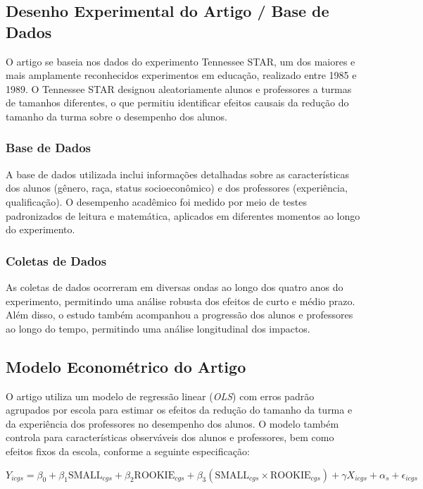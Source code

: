 \documentclass[a4paper,12pt]{article}[abntex2]
\begin{document}
\subsection{\textbf{Desenho Experimental do Artigo / Base de Dados}}

O artigo se baseia nos dados do experimento Tennessee STAR, um dos maiores e mais amplamente reconhecidos experimentos em educação, realizado entre 1985 e 1989. O Tennessee STAR designou aleatoriamente alunos e professores a turmas de tamanhos diferentes, o que permitiu identificar efeitos causais da redução do tamanho da turma sobre o desempenho dos alunos.

\subsubsection*{Base de Dados}
A base de dados utilizada inclui informações detalhadas sobre as características dos alunos (gênero, raça, status socioeconômico) e dos professores (experiência, qualificação). O desempenho acadêmico foi medido por meio de testes padronizados de leitura e matemática, aplicados em diferentes momentos ao longo do experimento.

\subsubsection*{Coletas de Dados}
As coletas de dados ocorreram em diversas ondas ao longo dos quatro anos do experimento, permitindo uma análise robusta dos efeitos de curto e médio prazo. Além disso, o estudo também acompanhou a progressão dos alunos e professores ao longo do tempo, permitindo uma análise longitudinal dos impactos.

\subsection{\textbf{Modelo Econométrico do Artigo}}

O artigo utiliza um modelo de regressão linear (\textit{OLS}) com erros padrão agrupados por escola para estimar os efeitos da redução do tamanho da turma e da experiência dos professores no desempenho dos alunos. O modelo também controla para características observáveis dos alunos e professores, bem como efeitos fixos da escola, conforme a seguinte especificação:

\begin{equation}
Y_{icgs} = \beta_0 + \beta_1 \text{SMALL}_{cgs} + \beta_2 \text{ROOKIE}_{cgs} + \beta_3 (\text{SMALL}_{cgs} \times \text{ROOKIE}_{cgs}) + \gamma X_{icgs} + \alpha_s + \epsilon_{icgs}
\end{equation}
\end{document}
